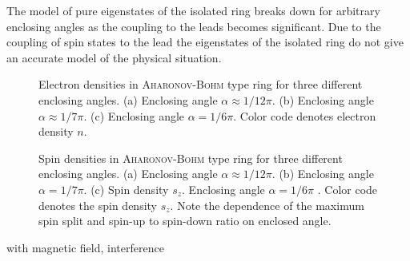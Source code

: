 The model of pure eigenstates of the isolated ring breaks down for arbitrary enclosing angles as the coupling to the leads becomes significant. Due to the coupling of spin states to the lead the eigenstates of the isolated ring do not give an accurate model of the physical situation.\par
\begin{figure}[h!]
  \hspace{-0.5em}
  \hspace{-0.5em}
  \caption{Electron densities in \textsc{Aharonov-Bohm} type ring for three different enclosing angles. (a) Enclosing angle $\alpha\approx 1/12 \pi$. (b) Enclosing angle $\alpha\approx 1/7\pi$. (c) Enclosing angle $\alpha=1/6\pi$. Color code denotes electron density $n$.} 
\end{figure}
\begin{figure}[h!]
  \hspace{-0.5em}
  \hspace{-0.5em}
  \caption{Spin densities in \textsc{Aharonov-Bohm} type ring for three different enclosing angles. (a) Enclosing angle $\alpha\approx 1/12 \pi$. (b) Enclosing angle $\alpha=1/7\pi$. (c) Spin density $s_z$. Enclosing angle $\alpha=1/6\pi$ . Color code denotes the spin density $s_z$. Note the dependence of the maximum spin split and spin-up to spin-down ratio on enclosed angle.}
\end{figure}
 with magnetic field, interference \cite{Nitta2002PhysicaE.12.753}
